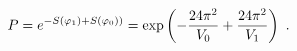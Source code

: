 \begin{equation}\label{HM}
P = e^{-S(\varphi_1)+S(\varphi_0))}= \exp\left(-{24\pi^2\over V_0}+{24\pi^2\over V_1}\right)
\ .
\end{equation}

